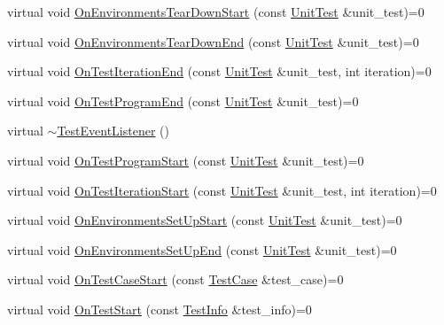 \begin{DoxyCompactItemize}
\item 
virtual void \hyperlink{classtesting_1_1TestEventListener_a1246b8fa84a0807afeffa6e986254ee8}{\-On\-Environments\-Tear\-Down\-Start} (const \hyperlink{classtesting_1_1UnitTest}{\-Unit\-Test} \&unit\-\_\-test)=0
\item 
virtual void \hyperlink{classtesting_1_1TestEventListener_a9cc8d7ef2c9e722a301ec4cee20633e2}{\-On\-Environments\-Tear\-Down\-End} (const \hyperlink{classtesting_1_1UnitTest}{\-Unit\-Test} \&unit\-\_\-test)=0
\item 
virtual void \hyperlink{classtesting_1_1TestEventListener_a7e35fec33b744e6a410f10e2fa090015}{\-On\-Test\-Iteration\-End} (const \hyperlink{classtesting_1_1UnitTest}{\-Unit\-Test} \&unit\-\_\-test, int iteration)=0
\item 
virtual void \hyperlink{classtesting_1_1TestEventListener_a543233908c4fd972550c7198c31c895a}{\-On\-Test\-Program\-End} (const \hyperlink{classtesting_1_1UnitTest}{\-Unit\-Test} \&unit\-\_\-test)=0
\item 
virtual \hyperlink{classtesting_1_1TestEventListener_aa248195927071de64a72a5557296497f}{$\sim$\-Test\-Event\-Listener} ()
\item 
virtual void \hyperlink{classtesting_1_1TestEventListener_a1dceff89a70d9e37ca025e8db3674eac}{\-On\-Test\-Program\-Start} (const \hyperlink{classtesting_1_1UnitTest}{\-Unit\-Test} \&unit\-\_\-test)=0
\item 
virtual void \hyperlink{classtesting_1_1TestEventListener_ac7cacc17e8a9b6e18d7c6031df762608}{\-On\-Test\-Iteration\-Start} (const \hyperlink{classtesting_1_1UnitTest}{\-Unit\-Test} \&unit\-\_\-test, int iteration)=0
\item 
virtual void \hyperlink{classtesting_1_1TestEventListener_a070798921b8d09f891e02762287ee5b0}{\-On\-Environments\-Set\-Up\-Start} (const \hyperlink{classtesting_1_1UnitTest}{\-Unit\-Test} \&unit\-\_\-test)=0
\item 
virtual void \hyperlink{classtesting_1_1TestEventListener_a9ff0d48e0f7c64dea5cb0a607498d6f6}{\-On\-Environments\-Set\-Up\-End} (const \hyperlink{classtesting_1_1UnitTest}{\-Unit\-Test} \&unit\-\_\-test)=0
\item 
virtual void \hyperlink{classtesting_1_1TestEventListener_aaf531e12c423fe117b7a4c6d2217dcf7}{\-On\-Test\-Case\-Start} (const \hyperlink{classtesting_1_1TestCase}{\-Test\-Case} \&test\-\_\-case)=0
\item 
virtual void \hyperlink{classtesting_1_1TestEventListener_a02f601dff022b7d252f54f559acaf3f7}{\-On\-Test\-Start} (const \hyperlink{classtesting_1_1TestInfo}{\-Test\-Info} \&test\-\_\-info)=0

\end{DoxyCompactItemize}
